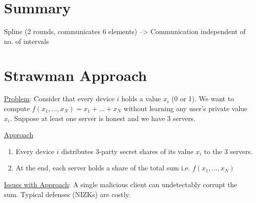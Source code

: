 
\clearpage
{}

%
\setcounter{section}{0} %

\section{Summary}
Spline (2 rounds, communicates 6 elements) --> Communication independent of no. of intervals


\section{Strawman Approach}

\underline{Problem}: Consider that every device $i$ holds a value $x_i$ (0 or 1). We want to compute $f(x_1, ..., x_N) = x_1 + ... + x_N$ without learning any user's private value $x_i$. Suppose at least one server is honest and we have 3 servers. 

\noindent \underline{Approach}
\begin{enumerate}
    \item Every device $i$ distributes 3-party secret shares of its value $x_i$ to the 3 servers.
    \item At the end, each server holds a share of the total sum i.e. $f(x_1, ..., x_N)$
\end{enumerate}

\noindent \underline{Issues with Approach}: A single malicious client can undetectably corrupt the sum. Typical defenses (NIZKs) are costly.

